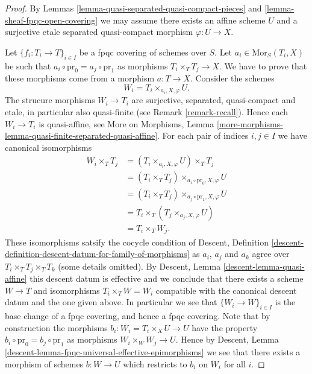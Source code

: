 \begin{proof}
By
Lemmas \ref{lemma-quasi-separated-quasi-compact-pieces}
and \ref{lemma-sheaf-fpqc-open-covering}
we may assume there exists an affine scheme $U$ and a
surjective etale separated quasi-compact morphism $\varphi : U \to X$.

\medskip\noindent
Let $\{f_i : T_i \to T\}_{i \in I}$ be a fpqc covering of schemes over $S$.
Let $a_i \in \text{Mor}_S(T_i, X)$ be such that
$a_i \circ \text{pr}_0 = a_j \circ \text{pr}_1$ as morphisms
$T_i \times_T T_j \to X$. We have to prove that these morphisms
come from a morphism $a : T \to X$. Consider the schemes
$$
W_i = T_i \times_{a_i, X, \varphi} U.
$$
The strucure morphisms $W_i \to T_i$ are surjective, separated, quasi-compact
and etale, in particular also quasi-finite (see Remark \ref{remark-recall}).
Hence each $W_i \to T_i$ is quasi-affine, see
More on Morphisms,
Lemma \ref{more-morphisms-lemma-quasi-finite-separated-quasi-affine}.
For each pair of indices $i, j \in I$ we have canonical isomorphisms
\begin{align*}
W_i \times_T T_j & =
(T_i \times_{a_i, X, \varphi} U) \times_T T_j \\
& =
(T_i \times_T T_j) \times_{a_i \circ \text{pr}_0, X, \varphi} U \\
& =
(T_i \times_T T_j) \times_{a_j \circ \text{pr}_1, X, \varphi} U \\
& =
T_i \times_T (T_j \times_{a_j, X, \varphi} U) \\
& =
T_i \times_T W_j.
\end{align*}
These isomorphisms satsify the cocycle condition of
Descent,
Definition \ref{descent-definition-descent-datum-for-family-of-morphisms}
as $a_i$, $a_j$ and $a_k$ agree over $T_i \times_T T_j \times_T T_k$
(some details omitted). By
Descent, Lemma \ref{descent-lemma-quasi-affine}
this descent datum is effective and
we conclude that there exists a scheme $W \to T$ and isomorphisms
$T_i \times_T W = W_i$ compatible with the canonical descent datum
and the one given above. In particular we see that
$\{W_i \to W\}_{i \in I}$ is the base change of a fpqc covering,
and hence a fpqc covering. Note that by construction the
morphisms $b_i : W_i = T_i \times_X U \to U$ have the property
$b_i \circ \text{pr}_0 = b_j \circ \text{pr}_1$ as morphisms
$W_i \times_W W_j \to U$. Hence by
Descent, Lemma \ref{descent-lemma-fpqc-universal-effective-epimorphisms}
we see that there exists a morphism of schemes $b : W \to U$
which restricts to $b_i$ on $W_i$ for all $i$.


\end{proof}
